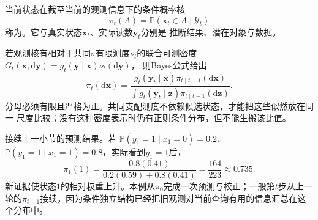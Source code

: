 \begin{definition}[滤波分布]
 \label{def:dynamical-filtering-distribution}
 当前状态在截至当前的观测信息下的条件概率核
 \begin{equation}
  \pi_t(A)=\mathbb P(\bm x_t\in A\mid\mathcal Y_t)
   \label{eq:dynamical-filtering-distribution}
 \end{equation}
 称为。它与真实状态$\bm x_t$、实际读数$\bm y_t$分别是
 推断结果、潜在对象与数据。
\end{definition}

若观测核有相对于共同$\sigma$有限测度$\nu_t$的联合可测密度
$G_t(\bm x,\mathrm d\bm y)=g_t(\bm y\mid\bm x)\nu_t(\mathrm d\bm y)$，
则Bayes公式给出
\begin{equation}
 \pi_t(\mathrm d\bm x)=
 \frac{g_t(\bm y_t\mid\bm x)\pi_{t\mid t-1}(\mathrm d\bm x)}
      {\int g_t(\bm y_t\mid\bm z)\pi_{t\mid t-1}(\mathrm d\bm z)}.
 \label{eq:dynamical-general-bayes-filter}
\end{equation}
分母必须有限且严格为正。共同支配测度不依赖候选状态，才能把这些似然放在同一
尺度比较；没有这种密度表示时仍有正则条件分布，但不能生搬该比值。

\begin{example}[两状态模型的一次预测与校正]
 \label{ex:dynamical-two-state-bayes-filter}
 接续上一小节的预测结果。若
 $\mathbb P(y_1=1\mid x_1=0)=0.2$、
 $\mathbb P(y_1=1\mid x_1=1)=0.8$，实际看到$y_1=1$后，
 \[
  \pi_1(1)=\frac{0.8(0.41)}{0.2(0.59)+0.8(0.41)}
              =\frac{164}{223}\approx0.735.
 \]
 新证据使状态$1$的相对权重上升。本例从$\pi_0$完成一次预测与校正；一般第$t$步从上一轮的$\pi_{t-1}$接续，因为条件独立结构已经把旧观测对当前查询有用的信息汇总在这个分布中。
\end{example}


